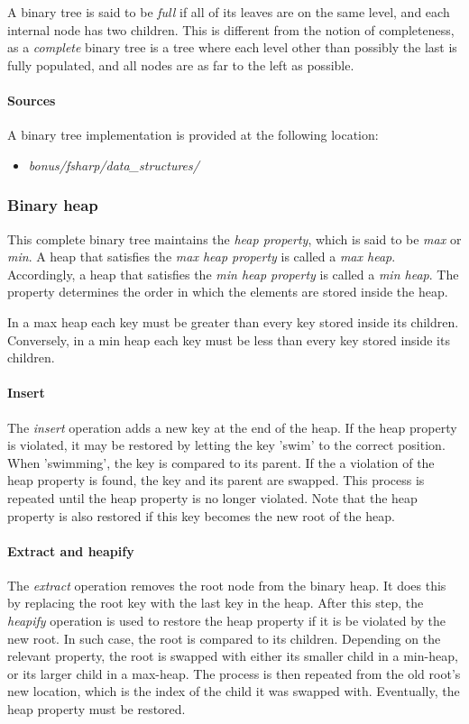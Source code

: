 \documentclass{article}
\begin{document}
A binary tree is said to be {\em full} if all of its leaves are on the same level,
and each internal node has two children. This is different from the notion of completeness,
as a {\em complete} binary tree is a tree where each level other than possibly the last is fully populated,
and all nodes are as far to the left as possible.

\paragraph{Sources}
A binary tree implementation is provided at the following location:
\begin{itemize}
  
\item{{\em bonus/fsharp/data\_structures/}}
\end{itemize}


\subsubsection{Binary heap}
This complete binary tree maintains the {\em heap property}, which is said to be {\em max} or {\em min}.
A heap that satisfies the {\em max heap property} is called a {\em max heap}.
Accordingly, a heap that satisfies the {\em min heap property} is called a {\em min heap}.
The property determines the order in which the elements are stored inside the heap.

In a max heap each key must be greater than every key stored inside its children.
Conversely, in a min heap each key must be less than every key stored inside its children.

\paragraph{Insert}
The {\em insert} operation adds a new key at the end of the heap. If the heap property is violated,
it may be restored by letting the key 'swim' to the correct position. When 'swimming', the key
is compared to its parent. If the a violation of the heap property is found, the key and its parent
are swapped. This process is repeated until the heap property is no longer violated. Note that the
heap property is also restored if this key becomes the new root of the heap.

\paragraph{Extract and heapify}
The {\em extract} operation removes the root node from the binary heap. It does this by replacing
the root key with the last key in the heap. After this step, the {\em heapify} operation is used to
restore the heap property if it is be violated by the new root. In such case, the root is compared
to its children. Depending on the relevant property, the root is swapped with either its smaller child in a
min-heap, or its larger child in a max-heap. The process is then repeated from the old root's new location,
which is the index of the child it was swapped with. Eventually, the heap property must be restored.
\end{document}
